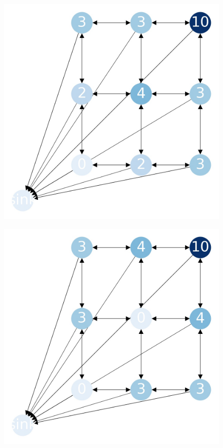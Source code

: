 \documentclass{beamer}
\begin{document}
\begin{frame}
  \begin{figure}[h!]
    \centering
      \includegraphics[scale=0.25]{sandpile_20}
  \end{figure}
\end{frame}


\begin{frame}
  \begin{figure}[h!]
    \centering
      \includegraphics[scale=0.25]{sandpile_21}
  \end{figure}
\end{frame}
\end{document}
